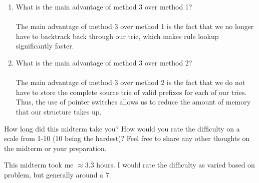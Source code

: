 \documentclass[10pt]{article}
\newenvironment{problem}[2][]{\begin{trivlist}
\item[\hskip \labelsep {\bfseries #1}\hskip \labelsep {\bfseries #2.}]}{\end{trivlist}}
\begin{document}
\begin{problem}{8: Grid of Tries}
\begin{enumerate}[label=(\alph*)]
\item What is the main advantage of method 3 over method 1?\\\\
The main advantage of method 3 over method 1 is the fact that we no longer have to backtrack back through our trie, which makes rule lookup significantly faster.
\item What is the main advantage of method 3 over method 2?\\\\
The main advantage of method 3 over method 2 is the fact that we do not have to store the complete source trie of valid prefixes for each of our tries. Thus, the use of pointer switches allows us to reduce the amount of memory that our structure takes up.
\end{enumerate}


\end{problem}
\newpage
\begin{problem}{9}
How long did this midterm take you? How would you rate the difficulty on a scale from 1-10 (10 being the hardest)? Feel free to share any other thoughts on the midterm or your preparation.
\end{problem}
This midterm took me $\approx 3.\overline{3}$ hours. I would rate the difficulty as varied based on problem, but generally around a 7.
\end{document}
